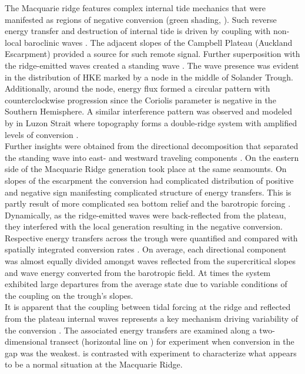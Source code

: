 \documentclass[12pt]{article}
\begin{document}
The Macquarie ridge features complex internal tide mechanics that were manifested as 
regions of negative conversion (green shading, ). Such reverse energy 
transfer and destruction of internal tide is driven by coupling with non-local baroclinic waves 
\citep{Kelly2010a}. The adjacent slopes of the Campbell Plateau (Auckland Escarpment) provided 
a source for such remote signal. Further superposition with the 
ridge-emitted waves created a standing wave . The wave presence was 
evident in the distribution of HKE marked by a node in the middle of Solander Trough. Additionally, 
around the node, energy flux formed a circular pattern  with 
counterclockwise progression since the Coriolis parameter is negative in the Southern Hemisphere. 
A similar interference pattern was observed and modeled by \cite{buijsman2014three} in Luzon 
Strait where topography forms a double-ridge system with amplified levels of conversion 
\citep{buijsman2012double, klymak2013parameterizing}.\\

Further insights were obtained from the directional decomposition that separated the 
standing wave into east- and westward traveling components . On 
the eastern side of the Macquarie Ridge generation took 
place at the same seamounts. On slopes of the escarpment the conversion had complicated  
distribution of positive and negative sign manifesting complicated structure of energy transfers. 
This is partly result of more complicated sea bottom relief and the barotropic forcing 
. Dynamically, as the ridge-emitted waves were 
back-reflected from the plateau, they interfered with the local generation 
resulting in the 
negative conversion.\\

Respective energy transfers across the trough were quantified and compared with spatially 
integrated conversion rates . On average, each directional component 
was almost equally divided amongst waves reflected from the supercritical slopes and wave energy 
converted from the barotropic field. At times the system exhibited large departures from the 
average state due to variable conditions of the coupling on the trough's slopes.\\

It is apparent that the coupling between tidal forcing at the ridge and reflected 
from the plateau internal waves represents a key mechanism driving variability of the 
conversion . The associated energy transfers are examined along a 
two-dimensional transect (horizontal line on ) for 
experiment  when conversion in the gap was the weakest.  is contrasted with 
experiment  to characterize what appears to be a normal situation at the Macquarie 
Ridge.
\end{document}
